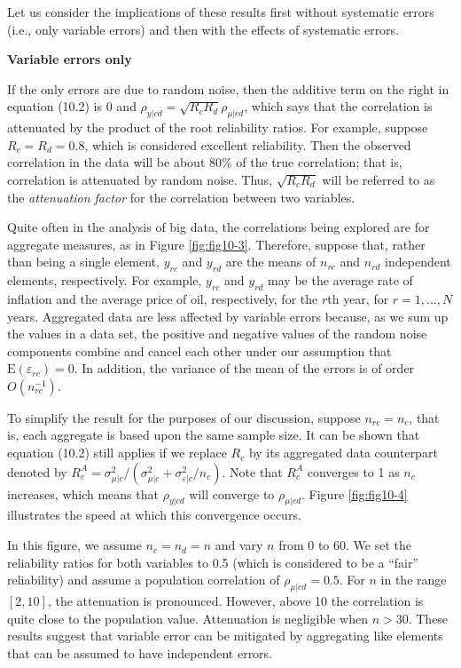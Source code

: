 \documentclass[]{krantz}
\begin{document}
Let us consider the implications of these results first without
systematic errors (i.e., only variable errors) and then with the effects
of systematic errors.

\textbf{Variable errors only}

If the only errors are due to random noise, then the additive term on
the right in equation (10.2) is 0 and
\(\rho_{y\vert cd} = \sqrt {R_c R_d } \rho _{\mu \vert cd}\), which says
that the correlation is attenuated by the product of the root
reliability ratios. For example, suppose \(R_c = R_d = 0.8\), which is
considered excellent reliability. Then the observed correlation in the
data will be about 80\% of the true correlation; that is, correlation is
attenuated by random noise. Thus, \(\sqrt {R_c R_d }\) will be referred
to as the \emph{attenuation factor} for the correlation between two
variables.

Quite often in the analysis of big data, the correlations being explored
are for aggregate measures, as in Figure \ref{fig:fig10-3}. Therefore,
suppose that, rather than being a single element, \(y_{rc}\) and
\(y_{rd}\) are the means of \(n_{rc}\) and \(n_{rd}\) independent
elements, respectively. For example, \(y_{rc}\) and \(y_{rd}\) may be
the average rate of inflation and the average price of oil,
respectively, for the \(r\)th year, for \(r = 1,\ldots ,N\) years.
Aggregated data are less affected by variable errors because, as we sum
up the values in a data set, the positive and negative values of the
random noise components combine and cancel each other under our
assumption that \(\mathrm{E}(\varepsilon_{rc} ) = 0\). In addition, the
variance of the mean of the errors is of order \(O(n_{rc}^{ - 1} )\).

To simplify the result for the purposes of our discussion, suppose
\(n_{rc} = n_c\), that is, each aggregate is based upon the same sample
size. It can be shown that equation (10.2) still applies if we replace
\(R_c\) by its aggregated data counterpart denoted by
\(R_c^A = \sigma_{\mu \vert c}^2 / (\sigma_{\mu \vert c}^2 + \sigma_{\varepsilon \vert c}^2 / n_c )\).
Note that \(R_c^A\) converges to 1 as \(n_c\) increases, which means
that \(\rho _{y\vert cd}\) will converge to \(\rho_{\mu \vert cd}\).
Figure \ref{fig:fig10-4} illustrates the speed at which this convergence
occurs.

In this figure, we assume \(n_c = n_d = n\) and vary \(n\) from 0 to 60.
We set the reliability ratios for both variables to 0.5 (which is
considered to be a ``fair'' reliability) and assume a population
correlation of \(\rho_{\mu \vert cd} = 0.5\). For \(n\) in the range
\([2,10]\), the attenuation is pronounced. However, above 10 the
correlation is quite close to the population value. Attenuation is
negligible when \(n > 30\). These results suggest that variable error
can be mitigated by aggregating like elements that can be assumed to
have independent errors.
\end{document}
